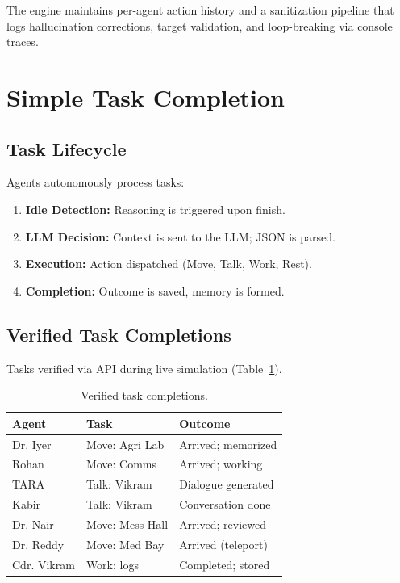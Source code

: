 \documentclass[10pt,conference]{IEEEtran}
\begin{document}
The engine maintains per-agent action history and a sanitization pipeline that logs hallucination corrections, target validation, and loop-breaking via console traces.

\section{Simple Task Completion}

\subsection{Task Lifecycle}

Agents autonomously process tasks:

\begin{enumerate}
    \item \textbf{Idle Detection:} Reasoning is triggered upon finish.
    \item \textbf{LLM Decision:} Context is sent to the LLM; JSON is parsed.
    \item \textbf{Execution:} Action dispatched (Move, Talk, Work, Rest).
    \item \textbf{Completion:} Outcome is saved, memory is formed.
\end{enumerate}

\subsection{Verified Task Completions}

Tasks verified via API during live simulation (Table~\ref{tab:tasks}).

\begin{table}[ht]
\centering
\caption{Verified task completions.}
\label{tab:tasks}
\scriptsize
\begin{tabular}{@{}llp{2.8cm}@{}}
\toprule
\textbf{Agent} & \textbf{Task} & \textbf{Outcome} \\
\midrule
Dr. Iyer   & Move: Agri Lab  & Arrived; memorized \\
Rohan      & Move: Comms     & Arrived; working \\
TARA       & Talk: Vikram    & Dialogue generated \\
Kabir      & Talk: Vikram    & Conversation done \\
Dr. Nair   & Move: Mess Hall & Arrived; reviewed \\
Dr. Reddy  & Move: Med Bay   & Arrived (teleport) \\
Cdr. Vikram& Work: logs      & Completed; stored \\
\bottomrule
\end{tabular}
\end{table}
\end{document}
